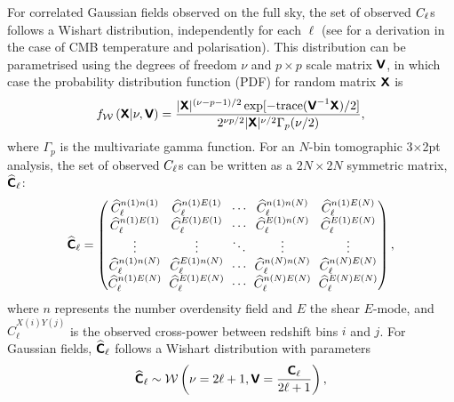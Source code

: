 For correlated Gaussian fields observed on the full sky, the set of observed $C_\ell$s follows a Wishart distribution, independently for each $\ell$ (see \citealt{Percival2006} for a derivation in the case of CMB temperature and polarisation). This distribution can be parametrised using the degrees of freedom $\nu$ and $p \times p$ scale matrix $\bm{\mathsf{V}}$, in which case the probability distribution function (PDF) for random matrix $\bm{\mathsf{X}}$ is \begin{equation}
f_\mathcal{W} \left( \bm{\mathsf{X}} | \nu, \bm{\mathsf{V}} \right) =
\frac{| \bm{\mathsf{X}} |^{(\nu - p - 1) / 2}
\exp [ -\text{trace}(\bm{\mathsf{V}}^{-1} \bm{\mathsf{X}})/2 ]}
{2^{\nu p / 2} |{\bm{\mathsf{X}}}|^{\nu / 2} \Gamma_p(\nu / 2)},
\end{equation}
where $\Gamma_p$ is the multivariate gamma function. For an $N$-bin tomographic 3$\times$2pt analysis, the set of observed $C_\ell$s can be written as a $2N \times 2N$ symmetric matrix, $\widehat{\bm{\mathsf{C}}}_\ell$:
\begin{equation}
\widehat{\mathbfss{C}}_\ell =
\begingroup
\setlength\arraycolsep{3pt} %
\begin{pmatrix}
\widehat{C}_\ell^{n (1) n (1)} & \widehat{C}_\ell^{n (1) E (1)} & \cdots
& \widehat{C}_\ell^{n (1) n (N)} & \widehat{C}_\ell^{n (1) E (N)} \\
\widehat{C}_\ell^{n (1) E (1)} & \widehat{C}_\ell^{E (1) E (1)} & \cdots &
\widehat{C}_\ell^{E (1) n (N)} & \widehat{C}_\ell^{E (1) E (N)} \\
\vdots & \vdots & \ddots & \vdots & \vdots \\
\widehat{C}_\ell^{n (1) n(N)} & \widehat{C}_\ell^{E (1) n(N)} & \cdots &
\widehat{C}_\ell^{n (N) n (N)} & \widehat{C}_\ell^{n (N) E (N)} \\
\widehat{C}_\ell^{n (1) E(N)} & \widehat{C}_\ell^{E (1) E(N)} & \cdots & \widehat{C}_\ell^{n (N) E (N)} & \widehat{C}_\ell^{E (N) E (N)} \\
\end{pmatrix},
\endgroup
\label{gl_Eqn:obs_cl_matrix}
\end{equation}
where $n$ represents the number overdensity field and $E$ the shear $E$-mode, and $\widehat{C}_\ell^{X (i) Y (j)}$ is the observed cross-power between redshift bins $i$ and $j$. For Gaussian fields, $\widehat{\bm{\mathsf{C}}}_\ell$ follows a Wishart distribution with parameters
\begin{equation}
\widehat{\bm{\mathsf{C}}}_\ell \sim
\mathcal{W} \left( \nu = 2 \ell + 1,
\bm{\mathsf{V}} = \frac{\bm{\mathsf{C}}_\ell}{2 \ell + 1} \right),
\label{gl_Eqn:wishart}
\end{equation}
